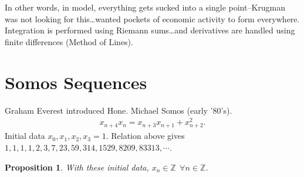 \documentclass[12pt,reqno]{amsart}
\numberwithin{equation}{section}  %
\newcommand{\zz}{\mathbb{Z}}
\newtheorem{proposition}[theorem]{Proposition}
\begin{document}
%
%
In other words, in model, everything gets sucked into a single point--Krugman
was not looking for this\ldots wanted pockets of economic activity to form
everywhere. Integration is performed using Riemann sums\ldots and derivatives
are handled using finite differences (Method of Lines). 
%
%
%
%
%
%
%
%
%
\section{Somos Sequences} 
\label{sec:somos}
Graham Everest introduced Hone. Michael Somos (early '80's). 
%
%
\begin{equation*}
    \begin{split}
	x_{n+4}x_{n} = x_{n+3}x_{n+1} + x_{n+2}^{2}.
    \end{split}
\end{equation*}
%
%
Initial data $x_{0}, x_{1}, x_{2}, x_{3} =1$. Relation above gives
\\ $1,1,1,1,2,3,7,23,59,314,1529,8209,83313,\cdots$. 
%
%
%
%
%
%                
%
%
%
%
\begin{proposition}
    With these initial data, $x_{n} \in \zz \ \ \forall n \in \zz$. 
    \label{prop:somos}
\end{proposition}
%
%
\end{document}
